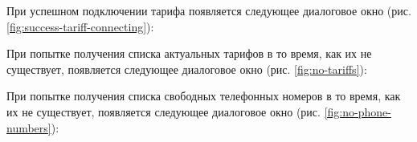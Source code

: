 При успешном подключении тарифа появляется следующее диалоговое окно (рис. \ref{fig:success-tariff-connecting}):

При попытке получения списка актуальных тарифов в то время, как их не существует, появляется следующее диалоговое окно (рис. \ref{fig:no-tariffs}):

При попытке получения списка свободных телефонных номеров в то время, как их не существует, появляется следующее диалоговое окно (рис. \ref{fig:no-phone-numbers}):
